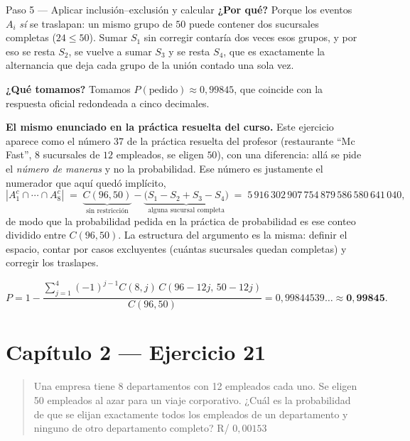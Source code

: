 \documentclass[11pt]{article}
\begin{document}
\begin{sol}
\begin{paso}{Paso 5 --- Aplicar inclusi\'on--exclusi\'on y calcular}
\textbf{¿Por qu\'e?} Porque los eventos $A_i$ \emph{s\'i} se traslapan: un mismo grupo de $50$ puede contener dos sucursales completas ($24\le 50$). Sumar $S_1$ sin corregir contar\'ia dos veces esos grupos, y por eso se resta $S_2$, se vuelve a sumar $S_3$ y se resta $S_4$, que es exactamente la alternancia que deja cada grupo de la uni\'on contado una sola vez.

\textbf{¿Qu\'e tomamos?} Tomamos $P(\text{pedido})\approx 0{,}99845$, que coincide con la respuesta oficial redondeada a cinco decimales.
\end{paso}

\begin{nota}
\textbf{El mismo enunciado en la pr\'actica resuelta del curso.} Este ejercicio aparece como el n\'umero 37 de la pr\'actica resuelta del profesor (restaurante ``Mc Fast'', $8$ sucursales de $12$ empleados, se eligen $50$), con una diferencia: all\'a se pide el \emph{n\'umero de maneras} y no la probabilidad. Ese n\'umero es justamente el numerador que aqu\'i qued\'o impl\'icito,
\[
|A_1^{c}\cap\cdots\cap A_8^{c}| \;=\; \underbrace{C(96,50)}_{\text{sin restricci\'on}}-\underbrace{\big(S_1-S_2+S_3-S_4\big)}_{\text{alguna sucursal completa}} \;=\; 5\,916\,302\,907\,754\,879\,586\,580\,641\,040 ,
\]
de modo que la probabilidad pedida en la pr\'actica de probabilidad es ese conteo dividido entre $C(96,50)$. La estructura del argumento es la misma: definir el espacio, contar por casos excluyentes (cu\'antas sucursales quedan completas) y corregir los traslapes.
\end{nota}

\end{sol}

\begin{resp}
\[
P=1-\frac{\sum_{j=1}^{4}(-1)^{j-1}C(8,j)\,C(96-12j,\,50-12j)}{C(96,50)}=0{,}99844539\ldots\approx\mathbf{0{,}99845}.
\]
\end{resp}

\section*{Cap\'itulo 2 --- Ejercicio 21}

\begin{quote}
Una empresa tiene 8 departamentos con 12 empleados cada uno. Se eligen 50 empleados al azar para un viaje corporativo. ¿Cu\'al es la probabilidad de que se elijan exactamente todos los empleados de un departamento y ninguno de otro departamento completo? \hfill R/ $0{,}00153$
\end{quote}
\end{document}

